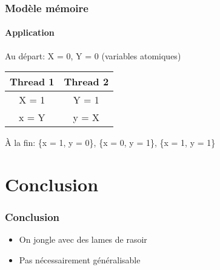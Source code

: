 \documentclass{beamer}
\begin{document}
\begin{frame}
\frametitle{Modèle mémoire}
\framesubtitle{Application}
Au départ: X = 0, Y = 0 (variables atomiques)

\begin{center}
\begin{tabular}{  c | c  }
  \hline
  Thread 1 & Thread 2 \\
  \hline
  X = 1 & Y = 1  \\

  x = Y & y = X \\
  \hline
\end{tabular}
\end{center}

À la fin: \{x = 1, y = 0\}, \{x = 0, y = 1\}, \{x = 1, y = 1\}

\end{frame}

\section{Conclusion}
\begin{frame}
\frametitle{Conclusion}
\begin{itemize}
\item On jongle avec des lames de rasoir
\item<2-> Pas nécessairement généralisable
\end{itemize}
\end{frame}
\end{document}
